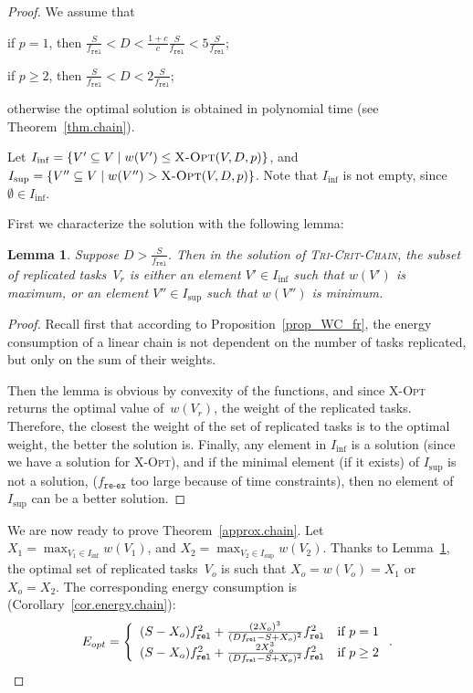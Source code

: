 \documentclass[a4paper]{article}
\theoremstyle{plain}
\newtheorem{lemma}{Lemma}
\theoremstyle{definition}
\theoremstyle{remark}
\newcommand{\fr}{\ensuremath{f_{\texttt{rel}}}\xspace}
\newcommand{\freex}{\ensuremath{f_{\texttt{re-ex}}}\xspace}
\newcommand{\xopt}{\textsc{X-Opt}}
\newcommand{\chain}{\textsc{Tri-Crit-Chain}\xspace}
\begin{document}
\begin{proof}
We assume that
\begin{compactitem}
    \item if $p=1$, then $\frac{S}{\fr}<D< \frac{1+c}{c}\frac{S}{\fr}
      <5\frac{S}{\fr}$; 
    \item if $p\geq2$, then $\frac{S}{\fr}<D< 2\frac{S}{\fr}$; 
\end{compactitem}
otherwise the optimal solution is obtained in polynomial time (see
Theorem~\ref{thm.chain}).  









Let $I_{\inf} = \{V' \subseteq V\; |\; w(V') \leq
      \xopt(V,D,p) \}$, and 
$I_{\sup} = \{V'' \subseteq V\; |\; w(V'') >
      \xopt(V,D,p) \}$. 
Note that $I_{\inf}$ is not empty, since $\emptyset \in I_{\inf}$. 


\smallskip
First we characterize the solution with the following lemma: 

\begin{lemma}
    \label{lemma.i1i2}
    Suppose $D > \frac{S}{\fr}$.  Then in the solution of \chain, the
    subset of replicated tasks~$V_r$ is either an element
    $V'\in I_{\inf}$ such that $w(V')$ is maximum, or an element
    $V''\in I_{\sup}$ such that $w(V'')$ is minimum. 
\end{lemma}

\begin{proof}
Recall first that according to Proposition~\ref{prop_WC_fr}, the
  energy consumption of a linear chain is not dependent on the number
  of tasks replicated, but only on the sum of their weights. 

  Then the lemma is obvious by convexity of the functions, and 
since \xopt\xspace returns the
  optimal value of~$w(V_r)$, the weight of the replicated tasks.
  Therefore, the closest the weight of the set of replicated tasks is
  to the optimal weight, the better the solution is. Finally, any element in $I_{\inf}$ is a solution (since we have a solution
  for \xopt), and if the minimal element (if it exists) of $I_{\sup}$
  is not a solution, (\freex too large because of time constraints),
  then no element of $I_{\sup}$ can be a better solution. 
\end{proof}




We are now ready to prove Theorem~\ref{approx.chain}.  
Let $X_1=\max_{V_1\in I_{\inf}} w(V_1)$, and 
 $X_2=\max_{V_2\in I_{\sup}} w(V_2)$.  
Thanks to Lemma~\ref{lemma.i1i2}, the optimal set of replicated
tasks~$V_o$ is such that $X_o=w(V_o)=X_1$ or $X_o=X_2$. 
The corresponding energy consumption is (Corollary~\ref{cor.energy.chain}): 
\[
  E_{opt} = \left\{
  \begin{array}{l l}
    (S-X_o)\fr^2 + \frac{(2X_o)^3}{(D\fr-S+X_o)^2}\fr^2 & \text{if $p=1$}\\
    (S-X_o)\fr^2 + \frac{2X_o^3}{(D\fr-S+X_o)^2}\fr^2 & \text{if $p\geq 2$}\\
  \end{array} \right.  . 
\]



\end{proof}
\end{document}
